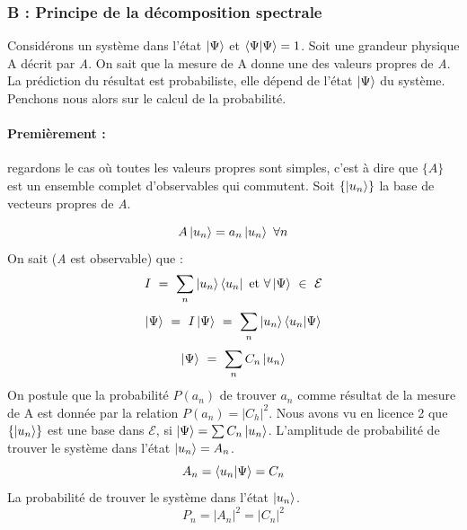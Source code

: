 \documentclass[12pt,a4paper,titlepage]{book}
\begin{document}
\subsubsection{B : Principe de la décomposition spectrale}
Considérons un système dans l'état $\ket \Psi$ et $\braket{\Psi | \Psi} = 1$. Soit une grandeur physique A décrit par \textit{A}. On sait que la mesure de A donne une des valeurs propres de \textit{A}. La prédiction du résultat est probabiliste, elle dépend de l'état $\ket \Psi$ du système. Penchons nous alors sur le calcul de la probabilité.\\

\paragraph*{Premièrement :}
regardons le cas où toutes les valeurs propres sont simples, c'est à dire que $\lbrace A \rbrace$ est un ensemble complet d'observables qui commutent. Soit $\lbrace \ket{u_n} \rbrace$ la base de vecteurs propres de \textit{A}.

\begin{equation*}
A \ket{u_n} = a_n \ket{u_n} ~\forall n
\end{equation*}
On sait (\textit{A} est observable) que :
\begin{equation*}
I ~=~ \sum\limits_n \ket{u_n} \bra{u_n} ~\text{et}~ \forall \ket\Psi ~\in~ \mathcal{E}
\end{equation*}
\begin{equation*}
\ket \Psi ~=~ I \ket\Psi ~=~ \sum\limits_n \ket{u_n} \braket{u_n | \Psi}
\end{equation*}
\begin{equation*}
\ket \Psi ~=~ \sum\limits_n C_n \ket{u_n}
\end{equation*}
On postule que la probabilité $P(a_n)$ de trouver $a_n$ comme résultat de la mesure de A est donnée par la relation $P(a_n) = \vert C_h \vert^2$. Nous avons vu en licence 2 que $\lbrace \ket{u_n} \rbrace$ est une base dans $\mathcal{E}$, si $\ket\Psi = \sum C_n \ket{u_n}$. L'amplitude de probabilité de trouver le système dans l'état $\ket{u_n} = A_n$.
\begin{equation*}
A_n = \braket{u_n | \Psi} = C_n
\end{equation*}
La probabilité de trouver le système dans l'état $\ket{u_n}$.
\begin{equation*}
P_n = \vert A_n \vert^2 = \vert C_n \vert^2
\end{equation*}\\
\end{document}
